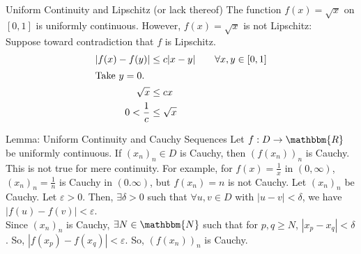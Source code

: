 \documentclass[10pt]{extarticle}
\newcommand{\N}{\mathbbm{N}}
\newcommand{\R}{\mathbbm{R}}
\begin{document}
  \begin{problem}{Uniform Continuity and Lipschitz (or lack thereof)}
    The function $f(x) = \sqrt{x}$ on $[0,1]$ is uniformly continuous. However, $f(x) = \sqrt{x}$ is not Lipschitz:\\

    Suppose toward contradiction that $f$ is Lipschitz.
    \begin{align*}
      |f(x) - f(y)| &\leq c|x-y| \tag*{$\forall x,y\in [0,1]$}\\
      \shortintertext{Take $y = 0$.}
      \sqrt{x} &\leq cx\\
      0 < \frac{1}{c} &\leq \sqrt{x}
    \end{align*}
  \end{problem}
  \begin{problem}{Lemma: Uniform Continuity and Cauchy Sequences}
    Let $f: D\rightarrow \R$ be uniformly continuous. If $(x_n)_n\in D$ is Cauchy, then $\left(f(x_n)\right)_n$ is Cauchy.\\

    This is not true for mere continuity. For example, for  $f(x) = \frac{1}{x}$ in $(0,\infty)$, $(x_n)_n = \frac{1}{n}$ is Cauchy in $(0.\infty)$, but $f(x_n) = n$ is not Cauchy.
    \tcblower
    Let $(x_n)_n$ be Cauchy. Let $\varepsilon > 0$. Then, $\exists \delta > 0$ such that $\forall u,v\in D$ with $|u-v| < \delta$, we have $|f(u) - f(v)| < \varepsilon$.\\

    Since $(x_n)_n$ is Cauchy, $\exists N\in \N$ such that for $p,q \geq N$, $|x_p - x_q| < \delta$. So, $|f(x_p) - f(x_q)| < \varepsilon$. So, $\left(f(x_n)\right)_n$ is Cauchy.
  \end{problem}
\end{document}

